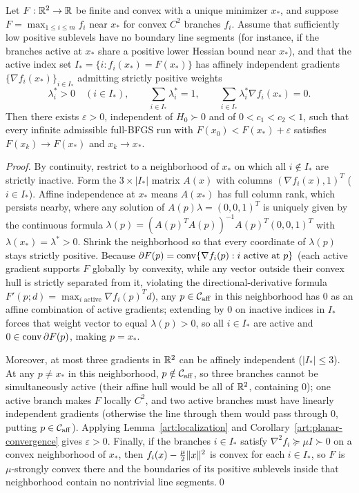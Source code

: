 \begin{corollary}\label{art:planar-max}
Let $F:\mathbb R^2\to\mathbb R$ be finite and convex with a unique minimizer $x_*$, and
suppose $F=\max_{1\le i\le m}f_i$ near $x_*$ for convex $C^2$ branches $f_i$.
Assume that sufficiently low positive sublevels have no boundary line segments
(for instance, if the branches active at $x_*$ share a positive lower Hessian
bound near $x_*$), and that the active index set $I_*=\{i:f_i(x_*)=F(x_*)\}$ has
affinely independent gradients $\{\nabla f_i(x_*)\}_{i\in I_*}$ admitting
strictly positive weights
\[
 \lambda_i^*>0\quad(i\in I_*),\qquad \sum_{i\in I_*}\lambda_i^*=1,
 \qquad \sum_{i\in I_*}\lambda_i^*\nabla f_i(x_*)=0.
\]
Then there exists $\varepsilon>0$, independent of $H_0\succ0$ and of
$0<c_1<c_2<1$, such that every infinite admissible full-BFGS run with
$F(x_0)<F(x_*)+\varepsilon$ satisfies $F(x_k)\to F(x_*)$ and $x_k\to x_*$.
\end{corollary}
\begin{proof}
By continuity, restrict to a neighborhood of $x_*$ on which all $i\notin I_*$
are strictly inactive. Form the $3\times|I_*|$ matrix $A(x)$ with columns
$(\nabla f_i(x),1)^T$ ($i\in I_*$). Affine independence at $x_*$ means $A(x_*)$
has full column rank, which persists nearby, where any solution of
$A(p)\lambda=(0,0,1)^T$ is uniquely given by the continuous formula
$\lambda(p)=(A(p)^TA(p))^{-1}A(p)^T(0,0,1)^T$ with $\lambda(x_*)=\lambda^*>0$.
Shrink the neighborhood so that every coordinate of $\lambda(p)$ stays strictly
positive. Because $\partial F(p)=\operatorname{conv}\{\nabla f_i(p):i\text{ active at }p\}$
(each active gradient supports $F$ globally by convexity, while any vector
outside their convex hull is strictly separated from it, violating the
directional-derivative formula $F'(p;d)=\max_{i\text{ active}}\nabla f_i(p)^Td$),
any $p\in\mathcal C_{\rm aff}$ in this neighborhood has $0$ as an affine
combination of active gradients; extending by $0$ on inactive indices in $I_*$
forces that weight vector to equal $\lambda(p)>0$, so all $i\in I_*$ are active
and $0\in\operatorname{conv}\partial F(p)$, making $p=x_*$.

Moreover, at most three gradients in $\mathbb R^2$ can be affinely independent ($|I_*|\le3$).
At any $p\ne x_*$ in this neighborhood, $p\notin\mathcal C_{\rm aff}$, so three
branches cannot be simultaneously active (their affine hull would be all of
$\mathbb R^2$, containing $0$); one active branch makes $F$ locally $C^2$, and two
active branches must have linearly independent gradients (otherwise the line
through them would pass through $0$, putting $p\in\mathcal C_{\rm aff}$).
Applying Lemma~\ref{art:localization} and Corollary~\ref{art:planar-convergence}
gives $\varepsilon>0$. Finally, if the branches $i\in I_*$ satisfy $\nabla^2f_i\succeq\mu I\succ0$ on
a convex neighborhood of $x_*$, then $f_i(x)-\tfrac\mu2\lVert x\rVert^2$ is convex for
each $i\in I_*$, so $F$ is $\mu$-strongly convex there and the boundaries of its
positive sublevels inside that neighborhood contain no nontrivial line
segments.\qed
\end{proof}

